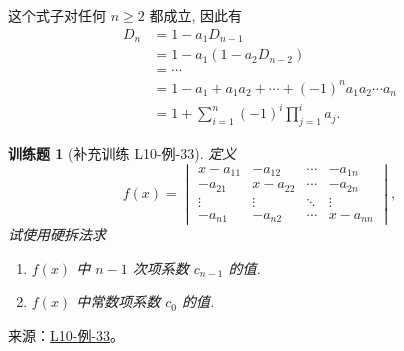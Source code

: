 \documentclass[UTF8,12pt,a4paper,fontset=fandol]{ctexart}
\newtheorem{exercise}{训练题}[section]
\begin{document}
\begin{solve}
    这个式子对任何 $n \geqslant 2$ 都成立, 因此有
    \begin{align*}
        D_n & =1-a_{1} D_{n-1}                                          \\
            & =1-a_{1}(1-a_{2} D_{n-2})                                 \\
            & =\cdots                                                   \\
            & =1-a_{1}+a_{1} a_{2}+\cdots+(-1)^n a_{1} a_{2} \cdots a_n \\
            & =1+\sum_{i=1}^{n}(-1)^i \prod_{j=1}^i a_j.
    \end{align*}
\end{solve}

\begin{exercise}[补充训练 L10-例-33]\label{prob:L10-例-33}
定义
    \[
        f(x) = \begin{vmatrix}
            x - a_{11} & - a_{12} & \cdots & - a_{1n} \\
            - a_{21} & x - a_{22} & \cdots & - a_{2n} \\
            \vdots   & \vdots   & \ddots & \vdots   \\
            - a_{n1} & - a_{n2} & \cdots & x - a_{nn}
        \end{vmatrix},
    \]
    试使用硬拆法求
    \begin{enumerate}
        \item $f(x)$ 中 $n-1$ 次项系数 $c_{n-1}$ 的值.
        \item $f(x)$ 中常数项系数 $c_0$ 的值.
    \end{enumerate}
\end{exercise}
\noindent 来源：\href{https://github.com/yhwu-is/Linear-Algebra-Left-Undone/blob/new/%E8%AE%B2%E4%B9%89/%E4%B8%93%E9%A2%98/10%20%E8%A1%8C%E5%88%97%E5%BC%8F.tex}{L10-例-33}。
\end{document}
